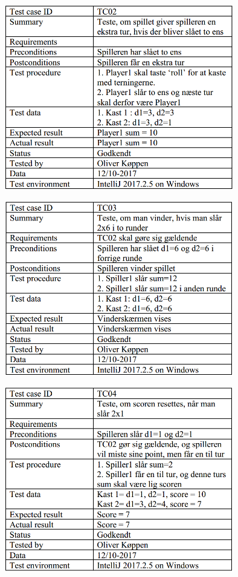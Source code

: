 \begin{figure}[h]
    \begin{center}
        \includegraphics[width=10cm]{graphics/TC02}
    \end{center}
\end{figure}


\begin{figure}[h]
    \begin{center}
        \includegraphics[width=10cm]{graphics/TC03}
    \end{center}
\end{figure}

\begin{figure}[h]
    \begin{center}
        \includegraphics[width=10cm]{graphics/TC04}
    \end{center}
\end{figure}


